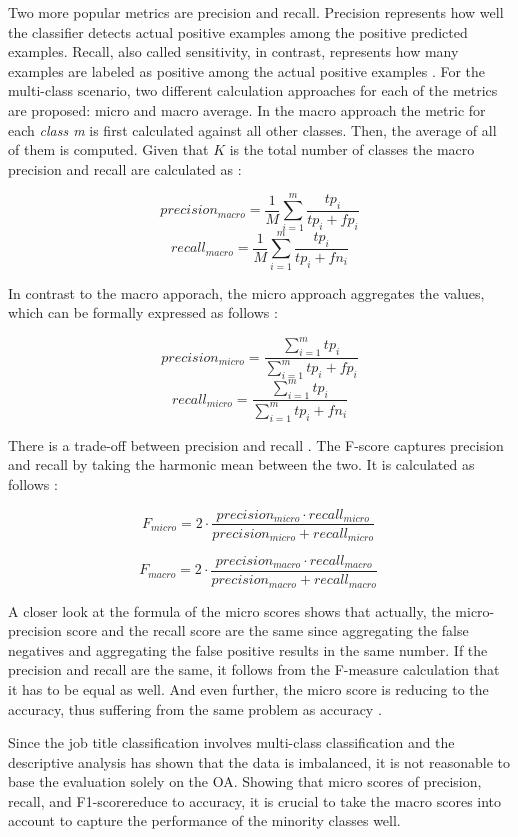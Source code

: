 \documentclass[12pt, a4paper, titlepage]{article}
\begin{document}
Two more popular metrics are precision and recall. Precision represents how well the classifier detects actual positive examples among the positive predicted examples. Recall, also called sensitivity, in contrast, represents how many examples are labeled as positive among the actual positive examples \citep{Berthold2020}. For the multi-class scenario, two different calculation approaches for each of the metrics are proposed: micro and macro average. In the macro approach the metric for each \textit{class m} is first calculated against all other classes. Then, the average of all of them is computed. Given that $K$ is the total number of classes the macro precision and recall are calculated as \citep{Branco2017}:

\[precision_{macro} = \frac{1}{M} \sum_{i=1}^m \frac{tp_{i}}{tp_{i} + fp_{i}}\]
\[recall_{macro} = \frac{1}{M} \sum_{i=1}^m \frac{tp_{i}}{tp_{i} + fn_{i}}\]

In contrast to the macro apporach, the micro approach aggregates the values, which can be formally expressed as follows \citep{Branco2017}: 

\[precision_{micro} = \frac{\sum_{i=1}^m tp_i}{\sum_{i=1}^m tp_i + fp_i}\]
\[recall_{micro} = \frac{\sum_{i=1}^m tp_i}{\sum_{i=1}^m tp_i + fn_i}\]

There is a trade-off between precision and recall \citep{Buckland1994}. The F-score captures precision and recall by taking the harmonic mean between the two. It is calculated as follows \citep{Branco2017,Pan2016}:  

\[F_{micro} = 2 \cdot \frac{precision_{micro} \cdot recall_{micro} }{precision_{micro} + recall_{micro} }\ \]

\[F_{macro} = 2 \cdot \frac{precision_{macro} \cdot recall_{macro} }{precision_{macro} + recall_{macro} }\ \]

A closer look at the formula of the micro scores shows that actually, the micro-precision score and the recall score are the same since aggregating the false negatives and aggregating the false positive results in the same number. If the precision and recall are the same, it follows from the F-measure calculation that it has to be equal as well. And even further, the micro score is reducing to the accuracy, thus suffering from the same problem as accuracy \citep{grandini2020}.

Since the job title classification involves multi-class classification and the descriptive analysis has shown that the data is imbalanced, it is not reasonable to base the evaluation solely on the \ac{OA}. Showing that micro scores of precision, recall, and F1-scorereduce to accuracy, it is crucial to take the macro scores into account to capture the performance of the minority classes well.
\end{document}
